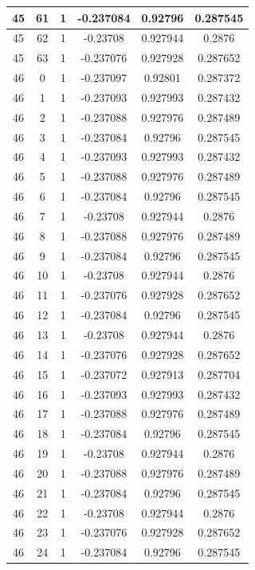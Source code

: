 \documentclass[12pt,a4paper]{article}
\numberwithin{equation}{section}
\numberwithin{figure}{section}
\numberwithin{table}{section}
\begin{document}
\begin{longtable}{|c|c|c|c|c|c|}
45 & 61 & 1 & -0.237084 & 0.92796 & 0.287545 \\ \hline
45 & 62 & 1 & -0.23708 & 0.927944 & 0.2876 \\ \hline
45 & 63 & 1 & -0.237076 & 0.927928 & 0.287652 \\ \hline
46 & 0 & 1 & -0.237097 & 0.92801 & 0.287372 \\ \hline
46 & 1 & 1 & -0.237093 & 0.927993 & 0.287432 \\ \hline
46 & 2 & 1 & -0.237088 & 0.927976 & 0.287489 \\ \hline
46 & 3 & 1 & -0.237084 & 0.92796 & 0.287545 \\ \hline
46 & 4 & 1 & -0.237093 & 0.927993 & 0.287432 \\ \hline
46 & 5 & 1 & -0.237088 & 0.927976 & 0.287489 \\ \hline
46 & 6 & 1 & -0.237084 & 0.92796 & 0.287545 \\ \hline
46 & 7 & 1 & -0.23708 & 0.927944 & 0.2876 \\ \hline
46 & 8 & 1 & -0.237088 & 0.927976 & 0.287489 \\ \hline
46 & 9 & 1 & -0.237084 & 0.92796 & 0.287545 \\ \hline
46 & 10 & 1 & -0.23708 & 0.927944 & 0.2876 \\ \hline
46 & 11 & 1 & -0.237076 & 0.927928 & 0.287652 \\ \hline
46 & 12 & 1 & -0.237084 & 0.92796 & 0.287545 \\ \hline
46 & 13 & 1 & -0.23708 & 0.927944 & 0.2876 \\ \hline
46 & 14 & 1 & -0.237076 & 0.927928 & 0.287652 \\ \hline
46 & 15 & 1 & -0.237072 & 0.927913 & 0.287704 \\ \hline
46 & 16 & 1 & -0.237093 & 0.927993 & 0.287432 \\ \hline
46 & 17 & 1 & -0.237088 & 0.927976 & 0.287489 \\ \hline
46 & 18 & 1 & -0.237084 & 0.92796 & 0.287545 \\ \hline
46 & 19 & 1 & -0.23708 & 0.927944 & 0.2876 \\ \hline
46 & 20 & 1 & -0.237088 & 0.927976 & 0.287489 \\ \hline
46 & 21 & 1 & -0.237084 & 0.92796 & 0.287545 \\ \hline
46 & 22 & 1 & -0.23708 & 0.927944 & 0.2876 \\ \hline
46 & 23 & 1 & -0.237076 & 0.927928 & 0.287652 \\ \hline
46 & 24 & 1 & -0.237084 & 0.92796 & 0.287545 \\ \hline

\end{longtable}
\end{document}
